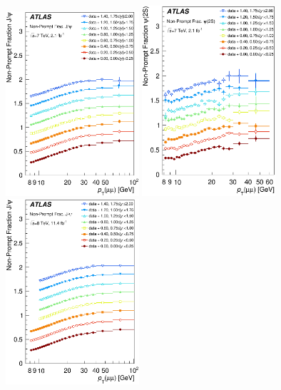 \begin{description}[style=unboxed,leftmargin=0cm]
\begin{figure} [!ht]
  \begin{center}
    \includegraphics[width=0.44\textwidth]{figures/ct_7TeV_NPF_Jpsi.eps} 
    \includegraphics[width=0.44\textwidth]{figures/ct_7TeV_NPF_Psi.eps}\hfil\\
    \includegraphics[width=0.44\textwidth]{figures/ct_8TeV_NPF_Jpsi.eps}

\end{center}
\end{figure}
\end{description}
